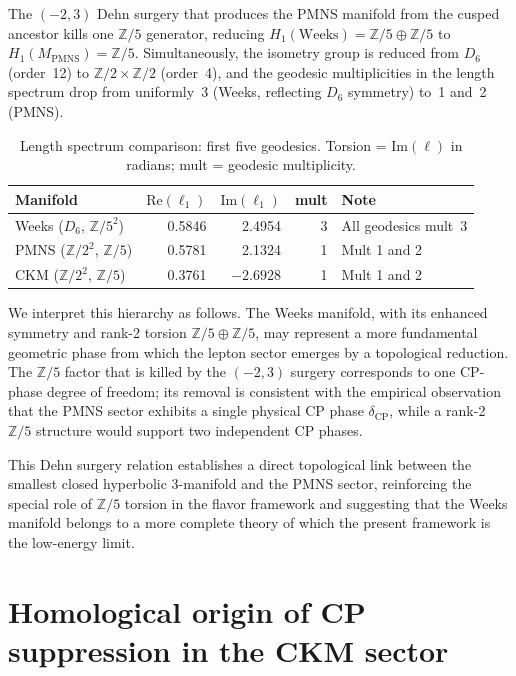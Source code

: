 ﻿\documentclass[12pt]{article}
\theoremstyle{definition}
\begin{document}
The $(-2,3)$ Dehn surgery that produces the PMNS manifold from the
cusped ancestor kills one $\mathbb{Z}/5$ generator, reducing
$H_1(\mathrm{Weeks}) = \mathbb{Z}/5 \oplus \mathbb{Z}/5$ to
$H_1(M_\mathrm{PMNS}) = \mathbb{Z}/5$.
Simultaneously, the isometry group is reduced from $D_6$ (order~12)
to $\mathbb{Z}/2 \times \mathbb{Z}/2$ (order~4), and the geodesic
multiplicities in the length spectrum drop from uniformly~3
(Weeks, reflecting $D_6$ symmetry) to~1 and~2 (PMNS).

\begin{table}[h]
\centering
\caption{Length spectrum comparison: first five geodesics.
Torsion = $\mathrm{Im}(\ell)$ in radians; mult = geodesic multiplicity.}
\label{tab:length_spectra}
\begin{tabular}{lrrrl}
\toprule
Manifold & $\mathrm{Re}(\ell_1)$ & $\mathrm{Im}(\ell_1)$ & mult & Note \\
\midrule
Weeks ($D_6$, $\mathbb{Z}/5^2$)  & 0.5846 & 2.4954 & 3 & All geodesics mult~3 \\
PMNS ($\mathbb{Z}/2^2$, $\mathbb{Z}/5$) & 0.5781 & 2.1324 & 1 & Mult 1 and 2 \\
CKM  ($\mathbb{Z}/2^2$, $\mathbb{Z}/5$) & 0.3761 & $-2.6928$ & 1 & Mult 1 and 2 \\
\bottomrule
\end{tabular}
\end{table}

We interpret this hierarchy as follows.
The Weeks manifold, with its enhanced symmetry and rank-2 torsion
$\mathbb{Z}/5 \oplus \mathbb{Z}/5$, may represent a more fundamental
geometric phase from which the lepton sector emerges by a topological
reduction. The $\mathbb{Z}/5$ factor that is killed by the
$(-2,3)$ surgery corresponds to one CP-phase degree of freedom; its
removal is consistent with the empirical observation that the PMNS
sector exhibits a single physical CP phase $\delta_\mathrm{CP}$,
while a rank-2 $\mathbb{Z}/5$ structure would support two independent
CP phases.

This Dehn surgery relation establishes a direct topological link
between the smallest closed hyperbolic 3-manifold and the PMNS sector,
reinforcing the special role of $\mathbb{Z}/5$ torsion in the flavor
framework and suggesting that the Weeks manifold belongs to a more
complete theory of which the present framework is the low-energy limit.


\section{Homological origin of CP suppression in the CKM sector}
\label{sec:homological_cp}
\end{document}
